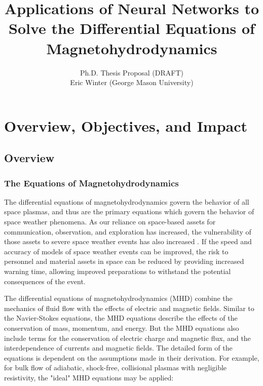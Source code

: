 \documentclass{article}
\title{Applications of Neural Networks to Solve the Differential Equations of Magnetohydrodynamics}
\author{Ph.D. Thesis Proposal (DRAFT)\\Eric Winter (George Mason University)}
\begin{document}
\begin{titlepage}
\maketitle
\end{titlepage}



\tableofcontents


\newpage

\section{Overview, Objectives, and Impact}

\subsection{Overview}

\subsubsection{The Equations of Magnetohydrodynamics}

The differential equations of magnetohydrodynamics govern the behavior of all space plasmas, and thus are the primary equations which govern the behavior of space weather phenomena. As our reliance on space-based assets for communication, observation, and exploration has increased, the vulnerability of those assets to severe space weather events has also increased \cite{NRC2009}. If the speed and accuracy of models of space weather events can be improved, the risk to personnel and material assets in space can be reduced by providing increased warning time, allowing improved preparations to withstand the potential consequences of the event.

The differential equations of magnetohydrodynamics (MHD) combine the mechanics of fluid flow with the effects of electric and magnetic fields. Similar to the Navier-Stokes equations, the MHD equations describe the effects of the conservation of mass, momentum, and energy. But the MHD equations also include terms for the conservation of electric charge and magnetic flux, and the interdependence of currents and magnetic fields. The detailed form of the equations is dependent on the assumptions made in their derivation. For example, for bulk flow of adiabatic, shock-free, collisional plasmas with negligible resistivity, the "ideal" MHD equations \cite{Chen1984} may be applied:
\end{document}
